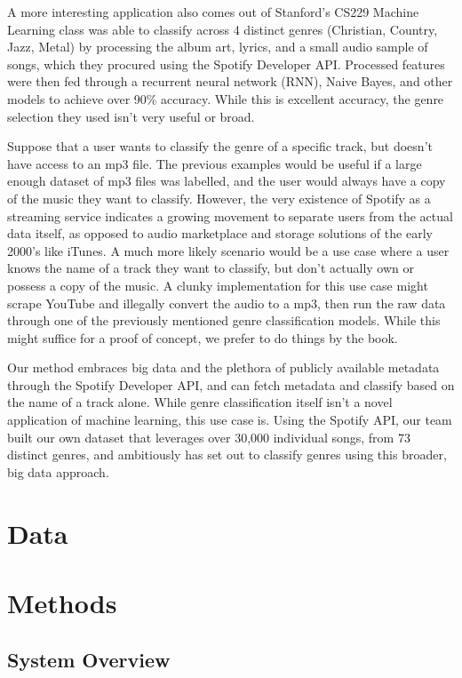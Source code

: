 \documentclass[conference]{IEEEtran}
\begin{document}
A more interesting application also comes out of Stanford's CS229 Machine Learning class was able to classify across 4 distinct genres (Christian, Country, Jazz, Metal) by processing the album art, lyrics, and a small audio sample of songs, which they procured using the Spotify Developer API. Processed features were then fed through a recurrent neural network (RNN), Naive Bayes, and other models to achieve over 90\% accuracy. While this is excellent accuracy, the genre selection they used isn't very useful or broad.

Suppose that a user wants to classify the genre of a specific track, but doesn't have access to an mp3 file. The previous examples would be useful if a large enough dataset of mp3 files was labelled, and the user would always have a copy of the music they want to classify. However, the very existence of Spotify as a streaming service indicates a growing movement to separate users from the actual data itself, as opposed to audio marketplace and storage solutions of the early 2000's like iTunes. A much more likely scenario would be a use case where a user knows the name of a track they want to classify, but don't actually own or possess a copy of the music. A clunky implementation for this use case might scrape YouTube and illegally convert the audio to a mp3, then run the raw data through one of the previously mentioned genre classification models. While this might suffice for a proof of concept, we prefer to do things by the book.

Our method embraces big data and the plethora of publicly available metadata through the Spotify Developer API, and can fetch metadata and classify based on the name of a track alone. While genre classification itself isn't a novel application of machine learning, this use case is. Using the Spotify API, our team built our own dataset that leverages over 30,000 individual songs, from 73 distinct genres, and ambitiously has set out to classify genres using this broader, big data approach.

\section{Data}

\section{Methods}

\subsection{System Overview}
\end{document}
